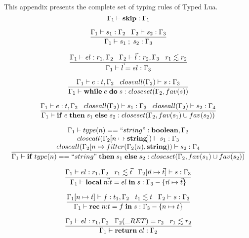 This appendix presents the complete set of typing rules of Typed Lua.
\\

\[
\Gamma_{1} \vdash \mathbf{skip}:\Gamma_{1}
\]

\[
\dfrac{\Gamma_{1} \vdash s_{1}:\Gamma_{2} \;\;\;
       \Gamma_{2} \vdash s_{2}:\Gamma_{3}}
      {\Gamma_{1} \vdash s_{1} \; ; \; s_{2}:\Gamma_{3}}
\]

\[
\dfrac{\Gamma_{1} \vdash el:r_{1}, \Gamma_{2} \;\;\;
       \Gamma_{2} \vdash \vec{l}:r_{2}, \Gamma_{3} \;\;\;
       r_{1} \lesssim r_{2}}
      {\Gamma_{1} \vdash \vec{l} = el:\Gamma_{3}}
\]

\[
\dfrac{\Gamma_{1} \vdash e:t, \Gamma_{2} \;\;\;
       closeall(\Gamma_{2}) \vdash s:\Gamma_{3}}
      {\Gamma_{1} \vdash \mathbf{while} \; e \; \mathbf{do} \; s:closeset(\Gamma_{2}, fav(s))}
\]

\[
\dfrac{\Gamma_{1} \vdash e:t, \Gamma_{2} \;\;\;
       closeall(\Gamma_{2}) \vdash s_{1}:\Gamma_{3} \;\;\;
       closeall(\Gamma_{2}) \vdash s_{2}:\Gamma_{4}}
      {\Gamma_{1} \vdash \mathbf{if} \; e \; \mathbf{then} \; s_{1} \; \mathbf{else} \; s_{2}:closeset(\Gamma_{2}, fav(s_{1}) \cup fav(s_{2}))}
\]

\[
\dfrac{\begin{array}{c}
       \Gamma_{1} \vdash type(n) == ``string":\mathbf{boolean}, \Gamma_{2} \\
       closeall(\Gamma_{2}[n \mapsto \mathbf{string}]) \vdash s_{1}:\Gamma_{3} \\
       closeall(\Gamma_{2}[n \mapsto filter(\Gamma_{2}(n), \mathbf{string})) \vdash s_{2}:\Gamma_{4}
      \end{array}}
      {\Gamma_{1} \vdash \mathbf{if} \; type(n) == ``string" \; \mathbf{then} \; s_{1} \; \mathbf{else} \; s_{2}:closeset(\Gamma_{2}, fav(s_{1}) \cup fav(s_{2}))}
\]

\[
\dfrac{\Gamma_{1} \vdash el:r_{1}, \Gamma_{2} \;\;\;
       r_{1} \lesssim \vec{t} \;\;\;
       \Gamma_{2}[\vec{n} \mapsto \vec{t}] \vdash s:\Gamma_{3}}
      {\Gamma_{1} \vdash \mathbf{local} \; \vec{n{:}t} = el \; \mathbf{in} \; s:\Gamma_{3} - \{\vec{n} \mapsto \vec{t}\}}
\]

\[
\dfrac{\Gamma_{1}[n \mapsto t] \vdash f:t_{1}, \Gamma_{2} \;\;\;
       t_{1} \lesssim t \;\;\;
       \Gamma_{2} \vdash s:\Gamma_{3}}
      {\Gamma_{1} \vdash \mathbf{rec} \; n{:}t = f \; \mathbf{in} \; s:\Gamma_{3} - \{n \mapsto t\}}
\]

\[
\dfrac{\env_{1} \vdash el:r_{1}, \env_{2} \;\;\;
       \env_{2}(\ret) = r_{2} \;\;\;
       r_{1} \lesssim r_{2}}
      {\env_{1} \vdash \mathbf{return} \; el:\env_{2}}
\]

